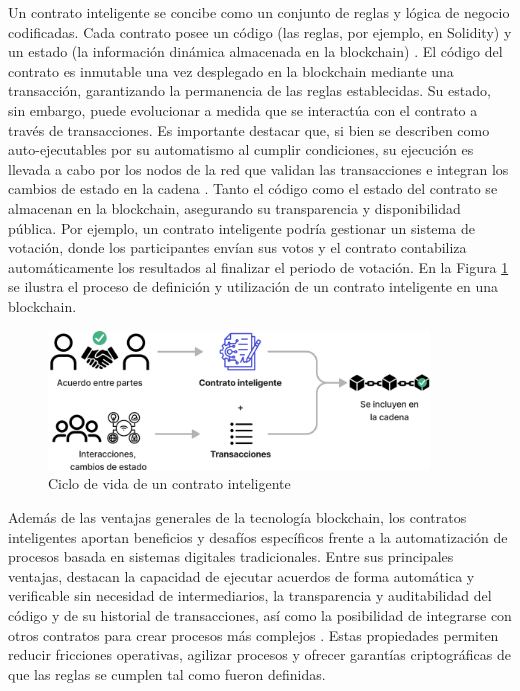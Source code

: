 Un contrato inteligente se concibe como un conjunto de reglas y lógica de negocio codificadas. Cada contrato posee un código (las reglas, por ejemplo, en Solidity) y un estado (la información dinámica almacenada en la blockchain) \cite{buterin2013ethereum}. El código del contrato es inmutable una vez desplegado en la blockchain mediante una transacción, garantizando la permanencia de las reglas establecidas. Su estado, sin embargo, puede evolucionar a medida que se interactúa con el contrato a través de transacciones. Es importante destacar que, si bien se describen como auto-ejecutables por su automatismo al cumplir condiciones, su ejecución es llevada a cabo por los \glspl{nodo} de la red que validan las transacciones e integran los cambios de estado en la cadena \cite{buterin2013ethereum}. Tanto el código como el estado del contrato se almacenan en la blockchain, asegurando su transparencia y disponibilidad pública. Por ejemplo, un contrato inteligente podría gestionar un sistema de votación, donde los participantes envían sus votos y el contrato contabiliza automáticamente los resultados al finalizar el periodo de votación. En la Figura \ref{fig:smart-contract-process} se ilustra el proceso de definición y utilización de un contrato inteligente en una blockchain.

\begin{figure}[!tb]
    \centering
    \includegraphics[width=0.9\textwidth]{Figures/smart-contract-process.png}
    \caption{Ciclo de vida de un contrato inteligente}
    \label{fig:smart-contract-process}
\end{figure}

Además de las ventajas generales de la tecnología blockchain, los contratos inteligentes aportan beneficios y desafíos específicos frente a la automatización de procesos basada en sistemas digitales tradicionales. Entre sus principales ventajas, destacan la capacidad de ejecutar acuerdos de forma automática y verificable sin necesidad de intermediarios, la transparencia y auditabilidad del código y de su historial de transacciones, así como la posibilidad de integrarse con otros contratos para crear procesos más complejos \cite{bartolomeo2020introduccion}. Estas propiedades permiten reducir fricciones operativas, agilizar procesos y ofrecer garantías criptográficas de que las reglas se cumplen tal como fueron definidas.

